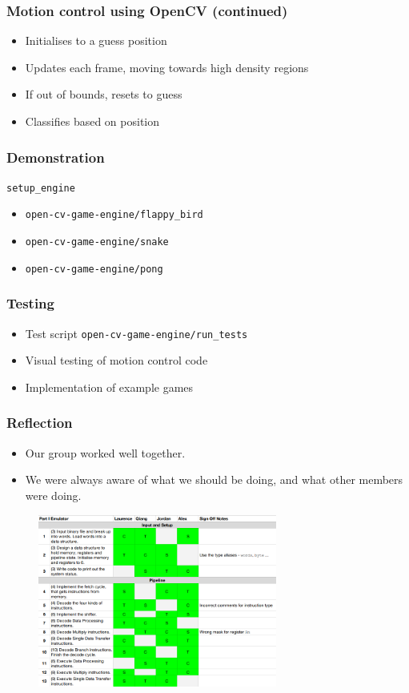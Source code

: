 \documentclass{beamer}
\begin{document}
\begin{frame}
	\frametitle{Motion control using OpenCV (continued)}
	\begin{itemize}
		\item Initialises to a guess position
		\item Updates each frame, moving towards high density regions
		\item If out of bounds, resets to guess
		\item Classifies based on position
	\end{itemize}
\end{frame}

\begin{frame}
	\frametitle{Demonstration}
	\texttt{setup\_engine}
	\begin{itemize}
		\item \texttt{open-cv-game-engine/flappy\_bird}
		\item \texttt{open-cv-game-engine/snake}
		\item \texttt{open-cv-game-engine/pong}
	\end{itemize}
\end{frame}

\begin{frame}
	\frametitle{Testing}
	\begin{itemize}
		\item Test script \texttt{open-cv-game-engine/run\_tests}
		\item Visual testing of motion control code
		\item Implementation of example games
	\end{itemize}
\end{frame}

\begin{frame}
\frametitle{Reflection}
\begin{itemize}
	\item Our group worked well together.
	\item We were always aware of what we should be doing, and what other members were doing.
\end{itemize}
\begin{figure}
	\includegraphics[width=0.7\textwidth]{Presentation/spreadsheet.png}
\end{figure}
\end{frame}
\end{document}
